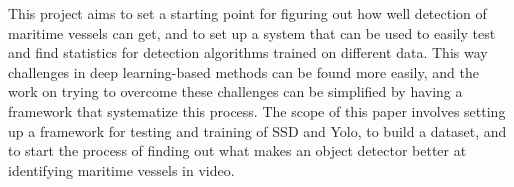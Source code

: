 \vspace{3mm}

This project aims to set a starting point for figuring out how well detection of maritime vessels can get, and to set up a system that can be used to easily test and find statistics for detection algorithms trained on different data. This way challenges in deep learning-based methods can be found more easily, and the work on trying to overcome these challenges can be simplified by having a framework that systematize this process. The scope of this paper involves setting up a framework for testing and training of SSD and Yolo, to build a dataset, and to start the process of finding out what makes an object detector better at identifying maritime vessels in video.


\cleardoublepage